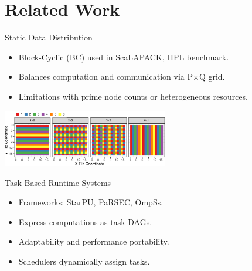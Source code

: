 \documentclass[12pt,xcolor=dvipsnames,presentation,aspectratio=169]{beamer}
\begin{document}
{\section{Related Work}
\label{sec:orgd8a20ba}
\begin{frame}[label={sec:org6bdcb9f}]{Static Data Distribution}
\begin{itemize}
\item \alert{Block-Cyclic (BC)} used in ScaLAPACK, HPL benchmark.
\item Balances computation and communication via P×Q grid.
\item Limitations with prime node counts or heterogeneous resources.
\end{itemize}
\begin{center}
\includegraphics[height=2.5cm]{../img/bc.pdf}
\end{center}
\end{frame}
\begin{frame}[label={sec:org3f0c482}]{Task-Based Runtime Systems}
\begin{itemize}
\item Frameworks: StarPU, PaRSEC, OmpSs.
\item Express computations as task DAGs.
\item Adaptability and performance portability.
\item Schedulers dynamically assign tasks.
\end{itemize}
\end{frame}
}
\end{document}
